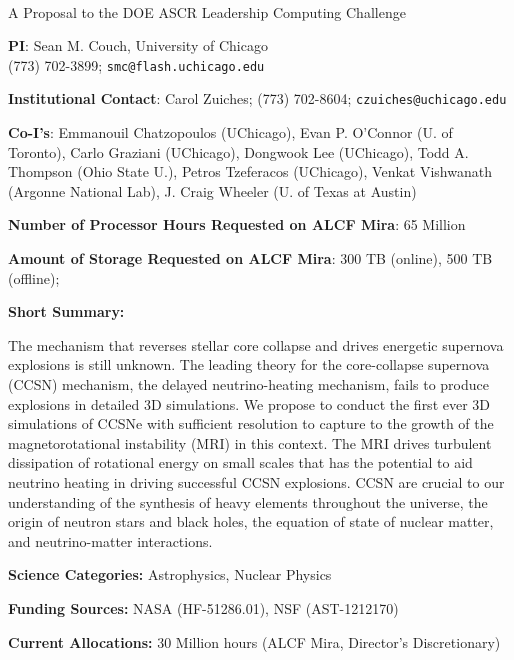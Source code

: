 \documentclass[12pt,letterpaper]{article}
\begin{document}
\setlength{\parindent}{0in}

\pagestyle{fancy}
\renewcommand{\headrulewidth}{0.0pt}

\begin{center} \textbf{\doctitle{}} \\
  A Proposal to the DOE ASCR Leadership Computing Challenge
\end{center}

\begin{flushleft}
\textbf{PI}:
Sean M. Couch, University of Chicago \\
(773) 702-3899; \texttt{smc@flash.uchicago.edu}
\medskip

\textbf{Institutional Contact}:
Carol Zuiches; (773) 702-8604; \texttt{czuiches@uchicago.edu}
\medskip

\textbf{Co-I's}:
Emmanouil Chatzopoulos (UChicago),
Evan P. O'Connor (U. of Toronto),
Carlo Graziani (UChicago),
Dongwook Lee (UChicago),
Todd A. Thompson (Ohio State U.),
Petros Tzeferacos (UChicago),
Venkat Vishwanath (Argonne National Lab),
J. Craig Wheeler (U. of Texas at Austin)
\medskip

\textbf{Number of Processor Hours Requested on ALCF Mira}:
65 Million
\medskip

\textbf{Amount of Storage Requested on ALCF Mira}:
300 TB (online), 500 TB (offline);
\medskip

\textbf{Short Summary:}

{\parindent 16pt

  The mechanism that reverses stellar core collapse and drives
  energetic supernova explosions is still unknown.
  The leading theory for the core-collapse supernova (CCSN) mechanism,
  the delayed neutrino-heating mechanism, fails to produce explosions
  in detailed 3D simulations.
  We propose to conduct the first ever 3D simulations of CCSNe with
  sufficient resolution to capture to the growth of the
  magnetorotational instability (MRI) in this context.
  The MRI drives turbulent dissipation of rotational energy on small
  scales that has the potential to aid neutrino heating in driving
  successful CCSN explosions.
  CCSN are crucial to our understanding of the synthesis of heavy
  elements throughout the universe, the origin of neutron stars and
  black holes, the equation of state of nuclear matter, and
  neutrino-matter interactions.

}
\medskip

\textbf{Science Categories:}  Astrophysics, Nuclear Physics
\medskip

\textbf{Funding Sources:}  NASA (HF-51286.01), NSF (AST-1212170)
\medskip

\textbf{Current Allocations:}  30 Million hours (ALCF Mira,
Director's Discretionary)

\end{flushleft}
\end{document}
